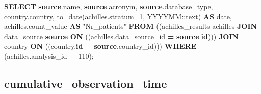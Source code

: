 \documentclass[
]{book}
\newenvironment{Shaded}{\begin{snugshade}}{\end{snugshade}}
\newcommand{\CharTok}[1]{\textcolor[rgb]{0.31,0.60,0.02}{#1}}
\newcommand{\DataTypeTok}[1]{\textcolor[rgb]{0.13,0.29,0.53}{#1}}
\newcommand{\DecValTok}[1]{\textcolor[rgb]{0.00,0.00,0.81}{#1}}
\newcommand{\FunctionTok}[1]{\textcolor[rgb]{0.00,0.00,0.00}{#1}}
\newcommand{\KeywordTok}[1]{\textcolor[rgb]{0.13,0.29,0.53}{\textbf{#1}}}
\newcommand{\NormalTok}[1]{#1}
\newcommand{\OperatorTok}[1]{\textcolor[rgb]{0.81,0.36,0.00}{\textbf{#1}}}
\newcommand{\OtherTok}[1]{\textcolor[rgb]{0.56,0.35,0.01}{#1}}
\newcommand{\StringTok}[1]{\textcolor[rgb]{0.31,0.60,0.02}{#1}}
\begin{document}
\begin{Shaded}
\begin{Highlighting}[]
\KeywordTok{SELECT} \KeywordTok{source}\NormalTok{.name,}
   \KeywordTok{source}\NormalTok{.acronym,}
   \KeywordTok{source}\NormalTok{.database\_type,}
\NormalTok{   country.country,}
   \FunctionTok{to\_date}\NormalTok{(achilles.stratum\_1, }\StringTok{\textquotesingle{}YYYYMM\textquotesingle{}}\NormalTok{:}\CharTok{:text}\NormalTok{) }\KeywordTok{AS} \DataTypeTok{date}\NormalTok{,}
\NormalTok{   achilles.count\_value }\KeywordTok{AS} \OtherTok{"Nr\_patients"}
  \KeywordTok{FROM}\NormalTok{ ((achilles\_results achilles}
    \KeywordTok{JOIN}\NormalTok{ data\_source }\KeywordTok{source}
      \KeywordTok{ON}\NormalTok{ ((achilles.data\_source\_id }\OperatorTok{=} \KeywordTok{source}\NormalTok{.}\KeywordTok{id}\NormalTok{)))}
    \KeywordTok{JOIN}\NormalTok{ country }\KeywordTok{ON}\NormalTok{ ((country.}\KeywordTok{id} \OperatorTok{=} \KeywordTok{source}\NormalTok{.country\_id)))}
 \KeywordTok{WHERE}\NormalTok{ (achilles.analysis\_id }\OperatorTok{=} \DecValTok{110}\NormalTok{);}
\end{Highlighting}
\end{Shaded}

\hypertarget{cumulative_observation_time}{%
\subsection*{cumulative\_observation\_time}\label{cumulative_observation_time}}
\end{document}
